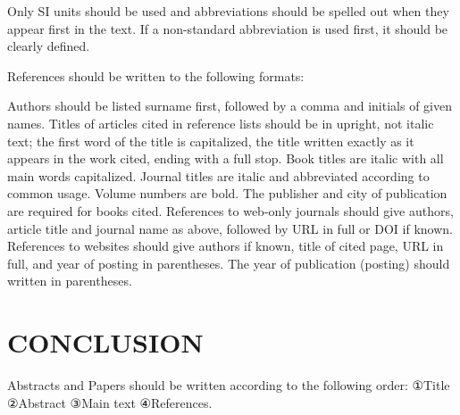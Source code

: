 \documentclass{abstract_hutech}
\begin{document}
Only SI units should be used and abbreviations should be spelled out when they appear first in the text. If a non-standard abbreviation is used first, it should be clearly defined.

References should be written to the following formats:

\noindent Authors should be listed surname first, followed by a comma and initials of given names. Titles of articles cited in reference lists should be in upright, not italic text; the first word of the title is capitalized, the title written exactly as it appears in the work cited, ending with a full stop. Book titles are italic with all main words capitalized. Journal titles are italic and abbreviated according to common usage. Volume numbers are bold. The publisher and city of publication are required for books cited. References to web-only journals should give authors, article title and journal name as above, followed by URL in full or DOI if known. References to websites should give authors if known, title of cited page, URL in full, and year of posting in parentheses. The year of publication (posting) should written in parentheses.

\section{CONCLUSION}

Abstracts and Papers should be written according to the following order: ①Title ②Abstract ③Main text ④References.

\end{document}
